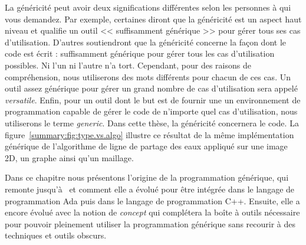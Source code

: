 La généricité peut avoir deux significations différentes selon les personnes à qui vous demandez. Par exemple, certaines
diront que la généricité est un aspect haut niveau et qualifie un outil << suffisamment générique >> pour gérer tous ses
cas d'utilisation. D'autres soutiendront que la généricité concerne la façon dont le code est écrit : suffisamment
générique pour gérer tous les cas d'utilisation possibles. Ni l'un ni l'autre n'a tort. Cependant, pour des raisons de
compréhension, nous utiliserons des mots différents pour chacun de ces cas. Un outil assez générique pour gérer un grand
nombre de cas d'utilisation sera appelé \emph{versatile}. Enfin, pour un outil dont le but est de fournir une un
environnement de programmation capable de gérer le code de n'importe quel cas d'utilisation, nous utiliserons le terme
\emph{generic}. Dans cette thèse, la généricité concernera le code. La figure~\ref{summary:fig:type.vs.algo} illustre ce
résultat de la même implémentation générique de l'algorithme de ligne de partage des eaux appliqué sur une image 2D, un
graphe ainsi qu'un maillage.

Dans ce chapitre nous présentons l'origine de la programmation générique, qui remonte
jusqu'à~ et comment elle a évolué pour être intégrée dans le langage de
programmation Ada puis dans le langage de programmation C++. Ensuite, elle a encore évolué avec la notion de
\emph{concept} qui complétera la boîte à outils nécessaire pour pouvoir pleinement utiliser la programmation générique
sans recourir à des techniques et outils obscurs.

